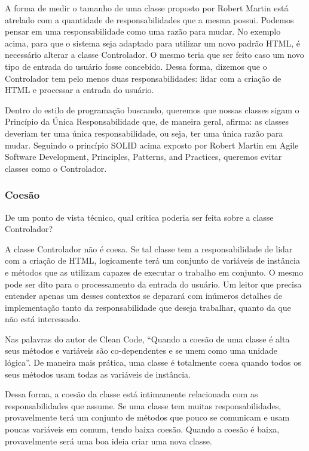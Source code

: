 	A forma de medir o tamanho de uma classe proposto por Robert Martin está atrelado com a quantidade de responsabilidades que a mesma possui. Podemos pensar em uma responsabilidade como uma razão para mudar. No exemplo acima, para que o sistema seja adaptado para utilizar um novo padrão HTML, é necessário alterar a classe Controlador. O mesmo teria que ser feito caso um novo tipo de entrada do usuário fosse concebido. Dessa forma, dizemos que o Controlador tem pelo menos duas responsabilidades: lidar com a criação de HTML e processar a entrada do usuário.
	
	Dentro do estilo de programação buscando, queremos que nossas classes sigam o Princípio da Única Responsabilidade que, de maneira geral, afirma: as classes deveriam ter uma única responsabilidade, ou seja, ter uma única razão para mudar. Seguindo o princípio SOLID acima exposto por Robert Martin em Agile Software Development, Principles, Patterns, and Practices, queremos evitar classes como o Controlador.

\subsubsection{Coesão}
	De um ponto de vista técnico, qual crítica poderia ser feita sobre a classe Controlador? 
	
	A classe Controlador não é coesa. Se tal classe tem a responsabilidade de lidar com a criação de HTML, logicamente terá um conjunto de variáveis de instância e métodos que as utilizam capazes de executar o trabalho em conjunto. O mesmo pode ser dito para o processamento da entrada do usuário. Um leitor que precisa entender apenas um desses contextos se deparará com inúmeros detalhes de implementação tanto da responsabilidade que deseja trabalhar, quanto da que não está interessado.
	
	Nas palavras do autor de Clean Code, “Quando a coesão de uma classe é alta seus métodos e variáveis são co-dependentes e se unem como uma unidade lógica”. De maneira mais prática, uma classe é totalmente coesa quando todos os seus métodos usam todas as variáveis de instância.
	
	Dessa forma, a coesão da classe está intimamente relacionada com as responsabilidades que assume. Se uma classe tem muitas responsabilidades, provavelmente terá um conjunto de métodos que pouco se comunicam e usam poucas variáveis em comum, tendo baixa coesão. Quando a coesão é baixa, provavelmente será uma boa ideia criar uma nova classe.

